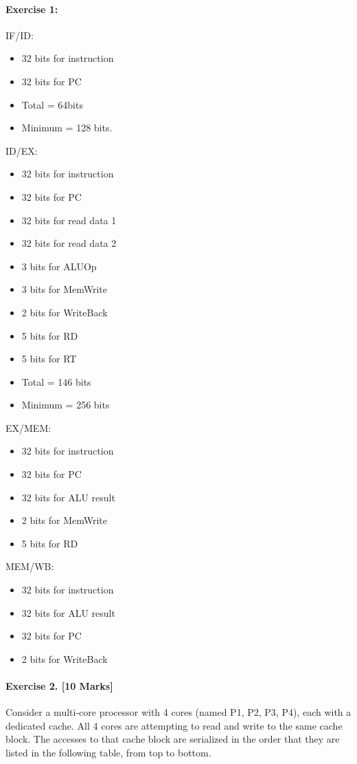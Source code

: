 \documentclass[12pt, a4paper]{article}
\begin{document}
\newpage

\paragraph{Exercise 1:} 
IF/ID: 
\begin{itemize}
    \item 32 bits for instruction
    \item 32 bits for PC
    \item Total = 64bits
    \item Minimum = 128 bits.
\end{itemize}
ID/EX:
\begin{itemize}
    \item 32 bits for instruction
    \item 32 bits for PC
    \item 32 bits for read data 1
    \item 32 bits for read data 2
    \item 3 bits for ALUOp
    \item 3 bits for MemWrite
    \item 2 bits for WriteBack
    \item 5 bits for RD
    \item 5 bits for RT
    \item Total = 146 bits
    \item Minimum = 256 bits
\end{itemize}
EX/MEM: 
\begin{itemize}
    \item 32 bits for instruction
    \item 32 bits for PC
    \item 32 bits for ALU result
    \item 2 bits for MemWrite
    \item 5 bits for RD
\end{itemize}
MEM/WB: 
\begin{itemize}
    \item 32 bits for instruction
    \item 32 bits for ALU result
    \item 32 bits for PC
    \item 2 bits for WriteBack
\end{itemize}
\newpage

\paragraph{Exercise 2. [10 Marks]} Consider a multi-core processor with 4 cores (named P1, P2, P3, P4), each with a dedicated cache. All 4 cores are attempting to read and write to the same cache block. The accesses to that cache block are serialized in the order that they are listed in the following table, from top to bottom.
\end{document}

